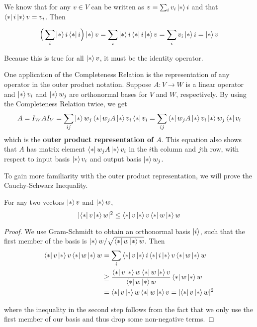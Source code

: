 \begin{lproof}
We know that for any $v \in V$ can be written as $v = \sum_{i} v_{i} \ket*{i}$ and that $\bra*{i} \ket*{v} = v_{i}$. Then 

$$\Big( \sum_{i} \ket*{i} \bra*{i} \Big) \ket*{v} = \sum_{i} \ket*{i} \bra*{i} \ket*{v} = \sum_{i} v_{i} \ket*{i} = \ket*{v}$$

Because this is true for all $\ket*{v}$, it must be the identity operator. 
\end{lproof}

One application of the Completeness Relation is the representation of any operator in the outer product notation. Suppose $A: V \rightarrow W$ is a linear operator and $\ket*{v_{i}}$ and $\ket*{w_{j}}$ are orthonormal bases for $V$ and $W$, respectively. By using the Completeness Relation twice, we get
$$A = I_{W} A I_{V} = \sum_{ij} \ket*{w_{j}} \bra*{w_{j}} A \ket*{v_{i}} \bra*{v_{i}} = \sum_{ij} \bra*{w_{j}} A \ket*{v_{i}} \ket*{w_{j}} \bra*{v_{i}}$$
which is the \textbf{outer product representation of $A$}. This equation also shows that $A$ has matrix element $\bra*{w_{j}}A\ket*{v_{i}}$ in the $i$th column and $j$th row, with respect to input basis $\ket*{v_{i}}$ and output basis $\ket*{w_{j}}$.

To gain more familiarity with the outer product representation, we will prove the Cauchy-Schwarz Inequality. 

\begin{theorem}
For any two vectors $\ket*{v}$ and $\ket*{w}$, $$\lvert\bra*{v}\ket*{w}\rvert^{2} \leq \bra*{v}\ket*{v} \bra*{w}\ket*{w}$$
\end{theorem}

\begin{proof}
We use Gram-Schmidt to obtain an orthonormal basis $\ket{i}$, such that the first member of the basis is $\ket*{w} / \sqrt{\bra*{w}\ket*{w}}$. Then 
$$
\begin{aligned} 
\bra*{v}\ket*{v} \bra*{w}\ket*{w} &= \sum_{i} \bra*{v}\ket*{i} \bra*{i}\ket*{v} \bra*{w}\ket*{w} \\
&\geq \frac{\bra*{v}\ket*{w} \bra*{w}\ket*{v}}{\bra*{w}\ket*{w}} \bra*{w}\ket*{w} \\ 
&= \bra*{v}\ket*{w} \bra*{w}\ket*{v} = \lvert\bra*{v}\ket*{w}\rvert^{2}
\end{aligned}
$$

where the inequality in the second step follows from the fact that we only use the first member of our basis and thus drop some non-negative terms.
\end{proof}

